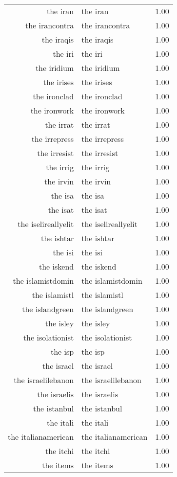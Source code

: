 \begin{table}[ht]
\begin{tabular}{rlr}
  the iran & the iran & 1.00 \\ 
  the irancontra & the irancontra & 1.00 \\ 
  the iraqis & the iraqis & 1.00 \\ 
  the iri & the iri & 1.00 \\ 
  the iridium & the iridium & 1.00 \\ 
  the irises & the irises & 1.00 \\ 
  the ironclad & the ironclad & 1.00 \\ 
  the ironwork & the ironwork & 1.00 \\ 
  the irrat & the irrat & 1.00 \\ 
  the irrepress & the irrepress & 1.00 \\ 
  the irresist & the irresist & 1.00 \\ 
  the irrig & the irrig & 1.00 \\ 
  the irvin & the irvin & 1.00 \\ 
  the isa & the isa & 1.00 \\ 
  the isat & the isat & 1.00 \\ 
  the iselireallyelit & the iselireallyelit & 1.00 \\ 
  the ishtar & the ishtar & 1.00 \\ 
  the isi & the isi & 1.00 \\ 
  the iskend & the iskend & 1.00 \\ 
  the islamistdomin & the islamistdomin & 1.00 \\ 
  the islamistl & the islamistl & 1.00 \\ 
  the islandgreen & the islandgreen & 1.00 \\ 
  the isley & the isley & 1.00 \\ 
  the isolationist & the isolationist & 1.00 \\ 
  the isp & the isp & 1.00 \\ 
  the israel & the israel & 1.00 \\ 
  the israelilebanon & the israelilebanon & 1.00 \\ 
  the israelis & the israelis & 1.00 \\ 
  the istanbul & the istanbul & 1.00 \\ 
  the itali & the itali & 1.00 \\ 
  the italianamerican & the italianamerican & 1.00 \\ 
  the itchi & the itchi & 1.00 \\ 
  the items & the items & 1.00 \\ 

\end{tabular}
\end{table}

